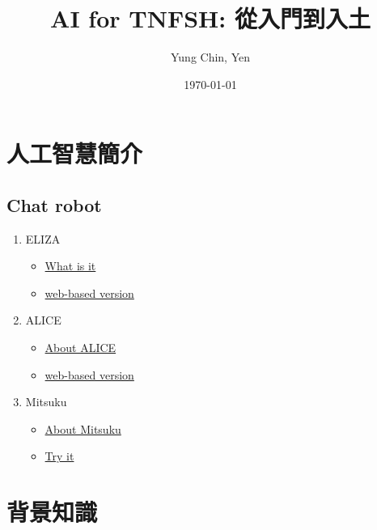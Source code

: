 \documentclass[a4paper,12pt]{article}
\author{Yung Chin, Yen}
\date{\today}
\title{AI for TNFSH: 從入門到入土}
\begin{document}
\maketitle
\setcounter{tocdepth}{2}
\tableofcontents

\newpage

\section{人工智慧簡介}
\label{sec:org8063307}
\subsection{Chat robot}
\label{sec:orgfe4f024}
\begin{enumerate}
\item ELIZA
\label{sec:org0fc2be1}
\begin{itemize}
\item \href{https://en.wikipedia.org/wiki/ELIZA\#cite\_note-turing-1}{What is it}\\
\item \href{https://web.njit.edu/\~ronkowit/eliza.html}{web-based version}\\
\end{itemize}
\item ALICE
\label{sec:org3e0d1bf}
\begin{itemize}
\item \href{https://en.wikipedia.org/wiki/Artificial\_Linguistic\_Internet\_Computer\_Entity}{About ALICE}\\
\item \href{http://www.mfellmann.net/content/alice.html}{web-based version}\\
\end{itemize}
\item Mitsuku
\label{sec:org4da6a7b}
\begin{itemize}
\item \href{https://en.wikipedia.org/wiki/Mitsuku}{About Mitsuku}\\
\item \href{https://chat.kuki.ai/}{Try it}\\
\end{itemize}
\newpage
\end{enumerate}

\section{背景知識}
\label{sec:org2c4eab9}
\newpage
\end{document}
